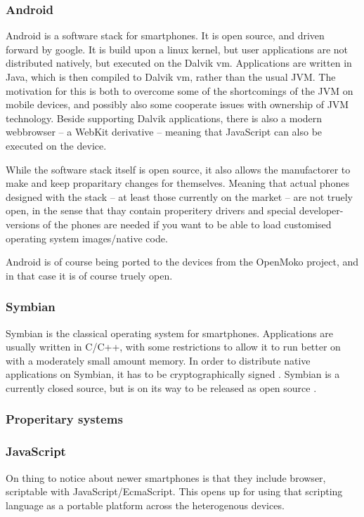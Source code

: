 \documentclass[11pt]{report}
\begin{document}
\subsubsection{Android}

Android is a software stack for smartphones. It is open source, and driven forward by google.
It is build upon a linux kernel, but user applications are not distributed natively, but executed on the Dalvik vm. Applications are written in Java, which is then compiled to Dalvik vm, rather than the usual JVM. The motivation for this is both to overcome some of the shortcomings of the JVM on mobile devices, and possibly also some cooperate issues with ownership of JVM technology.
Beside supporting Dalvik applications, there is also a modern webbrowser -- a WebKit derivative -- meaning that JavaScript can also be executed on the device.

While the software stack itself is open source, it also allows the manufactorer to make and keep proparitary changes for themselves. 
Meaning that actual phones designed with the stack -- at least those currently on the market -- are not truely open, in the sense that thay contain properitery drivers and special developer-versions of the phones are needed if you want to be able to load customised operating system images/native code.

Android is of course being ported to the devices from the OpenMoko project, and in that case it is of course truely open.

\subsubsection{Symbian}

Symbian is the classical operating system for smartphones. Applications are usually written in C/C++, with some restrictions to allow it to run better on with a moderately small amount memory. 
In order to distribute native applications on Symbian, it has to be cryptographically signed \cite{symbiansigned}.
Symbian is a currently closed source, but is on its way to be released as open source \cite{symbianopensource}.

\subsubsection{Properitary systems}

\subsubsection{JavaScript}
On thing to notice about newer smartphones is that they include browser, scriptable with JavaScript/EcmaScript. This opens up for using that scripting language as a portable platform across the heterogenous devices.
\end{document}
